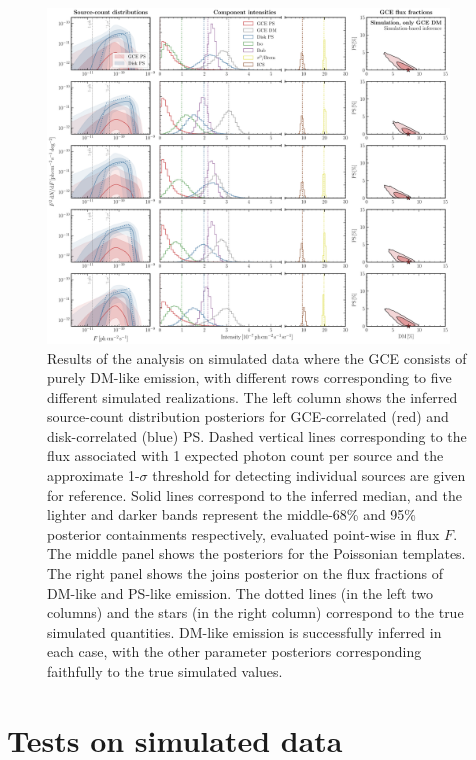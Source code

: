 \documentclass[prd,aps,10pt,nofootinbib,twocolumn,superscriptaddress,preprintnumbers,balancelastpage,longbibliography]{revtex4-1}
\begin{document}
%
\begin{figure}
\centering
\includegraphics[width=0.95\textwidth]{plots/sim_sbi_dm.pdf}
\caption{Results of the analysis on simulated \Fermi data where the GCE consists of purely DM-like emission, with different rows corresponding to five different simulated realizations. The left column shows the inferred source-count distribution posteriors for GCE-correlated (red) and disk-correlated (blue) PS. Dashed vertical lines corresponding to the flux associated with 1 expected photon count per source and the approximate 1-$\sigma$ threshold for detecting individual sources are given for reference. Solid lines correspond to the inferred median, and the lighter and darker bands represent the middle-68\% and 95\% posterior containments respectively, evaluated point-wise in flux $F$. The middle panel shows the posteriors for the Poissonian templates. The right panel shows the joins posterior on the flux fractions of DM-like and PS-like emission. The dotted lines (in the left two columns) and the stars (in the right column) correspond to the true simulated quantities. DM-like emission is successfully inferred in each case, with the other parameter posteriors corresponding faithfully to the true simulated values.} 
\label{fig:sim_sbi_dm}
\end{figure}
%

\section{Tests on simulated data}
\label{sec:simulations}
\end{document}
